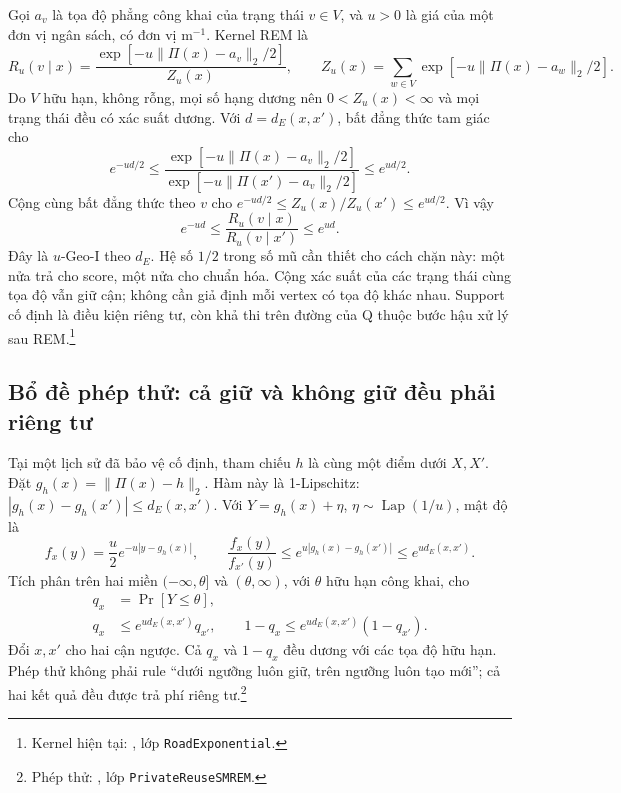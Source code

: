 Gọi $a_v$ là tọa độ phẳng công khai của trạng thái $v\in V$, và $u>0$ là
giá của một đơn vị ngân sách, có đơn vị $\mathrm m^{-1}$. Kernel REM là
\begin{equation}
 R_u(v\mid x)=\frac{\exp[-u\|\Pi(x)-a_v\|_2/2]}{Z_u(x)},\qquad
 Z_u(x)=\sum_{w\in V}\exp[-u\|\Pi(x)-a_w\|_2/2].
 \label{eq:formal-rem-kernel}
\end{equation}
Do $V$ hữu hạn, không rỗng, mọi số hạng dương nên $0<Z_u(x)<\infty$ và mọi
trạng thái đều có xác suất dương. Với $d=d_E(x,x')$, bất đẳng thức tam giác
cho
\begin{equation}
 e^{-ud/2}\leq
 \frac{\exp[-u\|\Pi(x)-a_v\|_2/2]}{\exp[-u\|\Pi(x')-a_v\|_2/2]}
 \leq e^{ud/2}.
 \label{eq:formal-rem-score}
\end{equation}
Cộng cùng bất đẳng thức theo $v$ cho
$e^{-ud/2}\leq Z_u(x)/Z_u(x')\leq e^{ud/2}$. Vì vậy
\begin{equation}
 e^{-ud}\leq\frac{R_u(v\mid x)}{R_u(v\mid x')}\leq e^{ud}.
 \label{eq:formal-rem-ratio}
\end{equation}
Đây là $u$-Geo-I theo $d_E$. Hệ số $1/2$ trong số mũ cần thiết cho cách
chặn này: một nửa trả cho score, một nửa cho chuẩn hóa. Cộng xác suất của
các trạng thái cùng tọa độ vẫn giữ cận; không cần giả định mỗi vertex có
tọa độ khác nhau. Support cố định là điều kiện riêng tư, còn khả thi trên
đường của Q thuộc bước hậu xử lý sau REM.\footnote{Kernel hiện tại:
, lớp \texttt{RoadExponential}.}

\subsection{Bổ đề phép thử: cả giữ và không giữ đều phải riêng tư}
\label{sec:formal-private-test}

Tại một lịch sử đã bảo vệ cố định, tham chiếu $h$ là cùng một điểm dưới
$X,X'$. Đặt $g_h(x)=\|\Pi(x)-h\|_2$. Hàm này là 1-Lipschitz:
$|g_h(x)-g_h(x')|\leq d_E(x,x')$. Với
$Y=g_h(x)+\eta$, $\eta\sim\operatorname{Lap}(1/u)$, mật độ là
\begin{equation}
 f_x(y)=\frac{u}{2}e^{-u|y-g_h(x)|},\qquad
 \frac{f_x(y)}{f_{x'}(y)}
 \leq e^{u|g_h(x)-g_h(x')|}\leq e^{ud_E(x,x')}.
 \label{eq:formal-laplace-density}
\end{equation}
Tích phân trên hai miền $(-\infty,\theta]$ và $(\theta,\infty)$, với
$\theta$ hữu hạn công khai, cho
\begin{equation}
 \begin{split}
 q_x&=\Pr[Y\leq\theta],\\
 q_x&\leq e^{ud_E(x,x')}q_{x'},\qquad
 1-q_x\leq e^{ud_E(x,x')}(1-q_{x'}).
 \end{split}
 \label{eq:formal-test-two-branches}
\end{equation}
Đổi $x,x'$ cho hai cận ngược. Cả $q_x$ và $1-q_x$ đều dương với các
tọa độ hữu hạn. Phép thử không phải rule ``dưới ngưỡng luôn giữ, trên ngưỡng
luôn tạo mới''; cả hai kết quả đều được trả phí riêng tư.\footnote{Phép thử:
, lớp \texttt{PrivateReuseSMREM}.}

